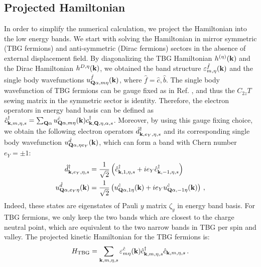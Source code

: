 \documentclass[prb,aps,nofootinbib,amssymb,twocolumn,superscriptaddress,10pt]{revtex4-2}
\newcommand{\beginsupplement}{
        \setcounter{table}{0}
        \renewcommand{\thetable}{S\arabic{table}}
        \setcounter{figure}{0}
        \renewcommand{\thefigure}{S\arabic{figure}}
        \setcounter{equation}{0}
        \renewcommand{\theequation}{S\arabic{equation}}
        \setcounter{section}{0}
        \renewcommand{\thesection}{Appendix \Alph{section}}
        \setcounter{subsection}{0}
        \renewcommand{\thesubsection}{\arabic{subsection}}
}
\begin{document}



\begin{widetext}

\tableofcontents

\beginsupplement

\section{Projected Hamiltonian}\label{app_sec:hamiltonian}

In order to simplify the numerical calculation, we project the Hamiltonian into the low energy bands. We start with solving the Hamiltonian in mirror symmetric (TBG fermions) and anti-symmetric (Dirac fermions) sectors in the absence of external displacement field.
By diagonalizing the TBG Hamiltonian $h^{(\eta)}(\mathbf{k})$ and the Dirac Hamiltonian $h^{D, \eta}(\mathbf{k})$, we obtained the band structure $\varepsilon_{m,\eta}^{\hat{f}}(\mathbf{k})$ and the single body wavefunctions $u^{\hat{f}}_{\mathbf{Q}\alpha,m\eta}(\mathbf{k})$, where $\hat{f} = \hat{c}, \hat{b}$. 
The single body wavefunction of TBG fermions can be gauge fixed as in Ref. \cite{XIE20a}, and thus the $C_{2z}T$ sewing matrix in the symmetric sector is identity. Therefore, the electron operators in energy band basis can be defined as $\hat{c}^\dagger_{\mathbf{k},m,\eta,s} = \sum_{\mathbf{Q}\alpha}u^{\hat{c}}_{\mathbf{Q}\alpha,m\eta}(\mathbf{k})c^\dagger_{\mathbf{k},\mathbf{Q},\eta,\alpha,s}$. Moreover, by using this gauge fixing choice, we obtain the following electron operators $\hat{d}^\dagger_{\mathbf{k},e_Y,\eta,s}$ and its corresponding single body wavefunction $u^{\hat{d}}_{\mathbf{Q}\alpha,\eta e_Y}(\mathbf{k})$, which can form a band with Chern number $e_Y = \pm1$:
 \begin{align}
 	\hat{d}^\dagger_{\mathbf{k}, e_Y, \eta, s} &= \frac{1}{\sqrt2}\left(\hat{c}^\dagger_{\mathbf{k},1,\eta,s} + ie_Y \hat{c}^\dagger_{\mathbf{k},-1,\eta,s} \right)\,\\
 	u^{\hat{d}}_{\mathbf{Q}\alpha,e_Y\eta}(\mathbf{k}) &= \frac{1}{\sqrt2}\left(u^{\hat{c}}_{\mathbf{Q}\alpha, 1\eta}(\mathbf{k}) + ie_Y u^{\hat{c}}_{\mathbf{Q}\alpha, -1\eta}(\mathbf{k}) \right)\,,
 \end{align}
Indeed, these states are eigenstates of Pauli $y$ matrix $\zeta_y$ in energy band basis. 
For TBG fermions, we only keep the two bands which are closest to the charge neutral point, which are equivalent to the two narrow bands in TBG per spin and valley. The projected kinetic Hamiltonian for the TBG fermions is:
\begin{equation}
	H_{\rm TBG} = \sum_{\mathbf{k},m,\eta,s}\varepsilon^{\hat{c}}_{m\eta}(\mathbf{k})\hat{c}^\dagger_{\mathbf{k},m,\eta,s}\hat{c}_{\mathbf{k},m,\eta,s}\,.
\end{equation}


\end{widetext}
\end{document}
